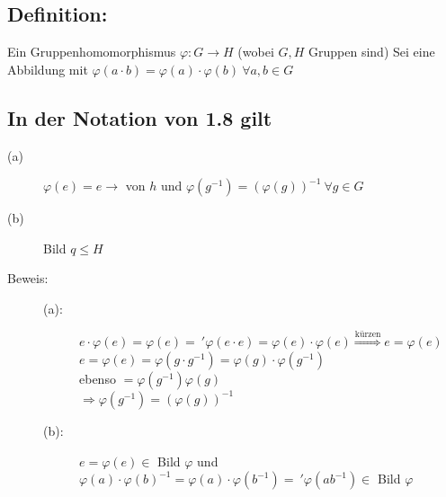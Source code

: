 \subsection{Definition:}
Ein Gruppenhomomorphismus $\varphi: G \rightarrow H$ (wobei $G,H$ Gruppen sind) Sei eine Abbildung mit $\varphi(a \cdot b) = \varphi (a) \cdot \varphi (b) \ \forall a,b \in G$
%
%
%
\subsection{In der Notation von 1.8 gilt}
\begin{description}
	\item[(a)] $\varphi(e)=e \rightarrow$ von $h$ und $\varphi(g^{-1}) = (\varphi(g))^{-1} \ \forall g \in G$
	\item[(b)] Bild $q \leq H$
	\item[Beweis:] \quad
	\begin{description}
		\item[(a):] $e \cdot \varphi(e) = \varphi(e) = \ '\varphi(e \cdot e) = \varphi(e) \cdot \varphi(e) 
				\mathop{\Rightarrow}\limits^{\text{kürzen}} e = \varphi(e)$\\
				$e = \varphi(e) = \varphi(g \cdot g^{-1}) = \varphi(g)\cdot\varphi(g^{-1})$\\
				ebenso $= \varphi(g^{-1})\varphi(g)$\\
				$\Rightarrow \varphi(g^{-1}) = (\varphi(g))^{-1}$
		\item[(b):] $e = \varphi(e) \in$ Bild $\varphi$ und $\varphi(a) \cdot \varphi(b)^{-1} = \varphi(a) \cdot 
				\varphi(b^{-1}) = \ '\varphi(ab^{-1}) \in$ Bild $\varphi$
	\end{description}
\end{description}
